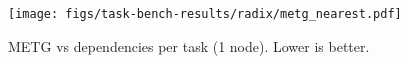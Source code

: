 \begin{figure}[t]
\centering
\texttt{[image: figs/task-bench-results/radix/metg\_nearest.pdf]}
\vspace{-0.6cm}
\caption{METG vs dependencies per task (1 node). Lower is better.\label{fig:radix}}
\vspace{-0.1cm}
\end{figure}
